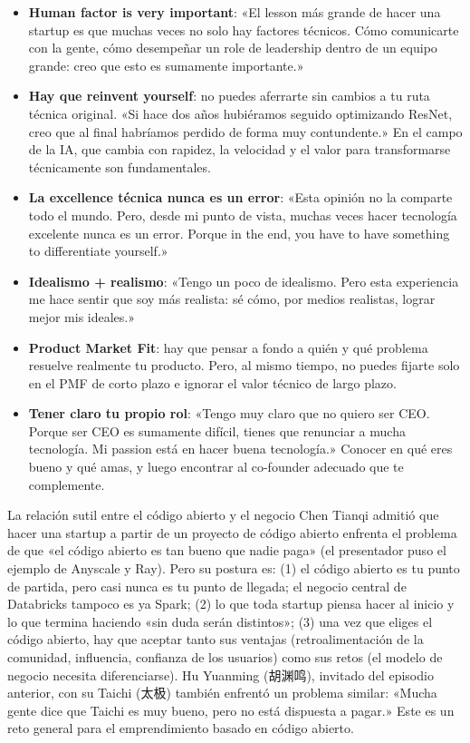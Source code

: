 \documentclass[a4paper]{article}
\begin{document}
\begin{itemize}
    \item \textbf{Human factor is very important}: «El lesson más grande de hacer una startup es que muchas veces no solo hay factores técnicos. Cómo comunicarte con la gente, cómo desempeñar un role de leadership dentro de un equipo grande: creo que esto es sumamente importante.»
    \item \textbf{Hay que reinvent yourself}: no puedes aferrarte sin cambios a tu ruta técnica original. «Si hace dos años hubiéramos seguido optimizando ResNet, creo que al final habríamos perdido de forma muy contundente.» En el campo de la IA, que cambia con rapidez, la velocidad y el valor para transformarse técnicamente son fundamentales.
    \item \textbf{La excellence técnica nunca es un error}: «Esta opinión no la comparte todo el mundo. Pero, desde mi punto de vista, muchas veces hacer tecnología excelente nunca es un error. Porque in the end, you have to have something to differentiate yourself.»
    \item \textbf{Idealismo + realismo}: «Tengo un poco de idealismo. Pero esta experiencia me hace sentir que soy más realista: sé cómo, por medios realistas, lograr mejor mis ideales.»
    \item \textbf{Product Market Fit}: hay que pensar a fondo a quién y qué problema resuelve realmente tu producto. Pero, al mismo tiempo, no puedes fijarte solo en el PMF de corto plazo e ignorar el valor técnico de largo plazo.
    \item \textbf{Tener claro tu propio rol}: «Tengo muy claro que no quiero ser CEO. Porque ser CEO es sumamente difícil, tienes que renunciar a mucha tecnología. Mi passion está en hacer buena tecnología.» Conocer en qué eres bueno y qué amas, y luego encontrar al co-founder adecuado que te complemente.
\end{itemize}

\begin{warningbox}{La relación sutil entre el código abierto y el negocio}
Chen Tianqi admitió que hacer una startup a partir de un proyecto de código abierto enfrenta el problema de que «el código abierto es tan bueno que nadie paga» (el presentador puso el ejemplo de Anyscale y Ray). Pero su postura es: (1) el código abierto es tu punto de partida, pero casi nunca es tu punto de llegada; el negocio central de Databricks tampoco es ya Spark; (2) lo que toda startup piensa hacer al inicio y lo que termina haciendo «sin duda serán distintos»; (3) una vez que eliges el código abierto, hay que aceptar tanto sus ventajas (retroalimentación de la comunidad, influencia, confianza de los usuarios) como sus retos (el modelo de negocio necesita diferenciarse). Hu Yuanming (胡渊鸣), invitado del episodio anterior, con su Taichi (太极) también enfrentó un problema similar: «Mucha gente dice que Taichi es muy bueno, pero no está dispuesta a pagar.» Este es un reto general para el emprendimiento basado en código abierto.
\end{warningbox}
\end{document}
